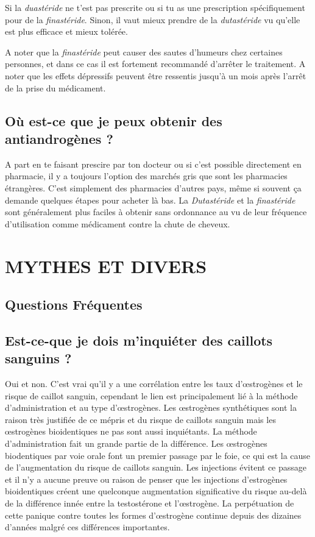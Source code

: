\documentclass{article}
\begin{document}
Si la \textit{duastéride} ne t'est pas prescrite ou si tu as une prescription spécifiquement pour de la \textit{finastéride}. Sinon, il vaut mieux prendre de la \textit{dutastéride} vu qu'elle est plus efficace et mieux tolérée.

A noter que la \textit{finastéride} peut causer des sautes d'humeurs chez certaines personnes, et dans ce cas il est fortement recommandé d'arrêter le traitement. A noter que les effets dépressifs peuvent être ressentis jusqu'à un mois après l'arrêt de la prise du médicament.

\subsection{Où est-ce que je peux obtenir des antiandrogènes ?}

A part en te faisant prescire par ton docteur ou si c'est possible directement en pharmacie, il y a toujours l'option des marchés gris que sont les pharmacies étrangères. C'est simplement des pharmacies d'autres pays, même si souvent ça demande quelques étapes pour acheter là bas. La \textit{Dutastéride} et la \textit{finastéride} sont généralement plus faciles à obtenir sans ordonnance au vu de leur fréquence d'utilisation comme médicament contre la chute de cheveux.
 

\section{MYTHES ET DIVERS}\label{MM}


\subsection*{Questions Fréquentes}

\subsection{Est-ce-que je dois m'inquiéter des caillots sanguins ?}\label{11-1}

Oui et non. C'est vrai qu'il y a une corrélation entre les taux d'œstrogènes et le risque de caillot sanguin, cependant le lien est principalement lié à la méthode d'administration et au type d'œstrogènes. Les œstrogènes synthétiques sont la raison très justifiée de ce mépris et du risque de caillots sanguin mais les œstrogènes bioidentiques ne pas sont aussi inquiétants. La méthode d'administration fait un grande partie de la différence. Les œstrogènes biodentiques par voie orale font un premier passage par le foie, ce qui est la cause de l'augmentation du risque de caillots sanguin. Les injections évitent ce passage et il n'y a aucune preuve ou raison de penser que les injections d'estrogènes bioidentiques créent une quelconque augmentation significative du risque au-delà de la différence innée entre la testostérone et l'œstrogène. La perpétuation de cette panique contre toutes les formes d'œstrogène continue depuis des dizaines d'années malgré ces différences importantes.
\end{document}

